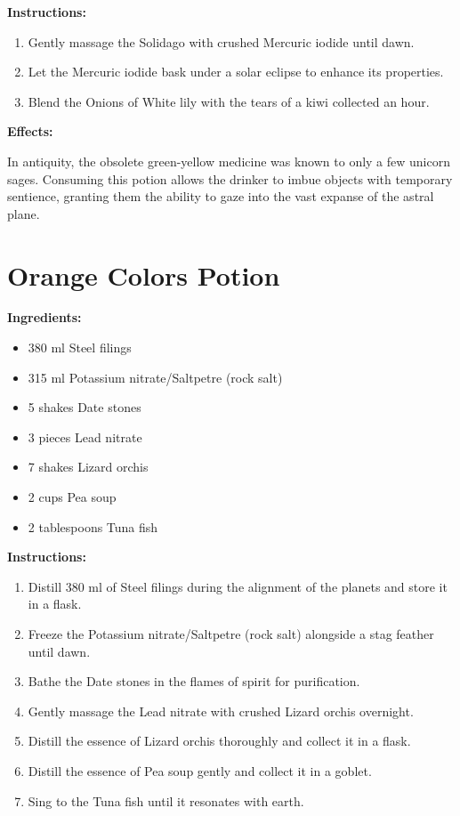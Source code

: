 \documentclass{article}
\begin{document}
\textbf{Instructions:}

\begin{enumerate}
  \item Gently massage the Solidago with crushed Mercuric iodide until dawn.
  \item Let the Mercuric iodide bask under a solar eclipse to enhance its properties.
  \item Blend the Onions of White lily with the tears of a kiwi collected an hour.
\end{enumerate}

\textbf{Effects:}

In antiquity, the obsolete green-yellow medicine was known to only a few unicorn sages. Consuming this potion allows the drinker to imbue objects with temporary sentience, granting them the ability to gaze into the vast expanse of the astral plane.

\newpage
\section*{Orange Colors Potion}

\textbf{Ingredients:}

\begin{itemize}
  \item 380 ml Steel filings
  \item 315 ml Potassium nitrate/Saltpetre (rock salt)
  \item 5 shakes Date stones
  \item 3 pieces Lead nitrate
  \item 7 shakes Lizard orchis
  \item 2 cups Pea soup
  \item 2 tablespoons Tuna fish
\end{itemize}

\textbf{Instructions:}

\begin{enumerate}
  \item Distill 380 ml of Steel filings during the alignment of the planets and store it in a flask.
  \item Freeze the Potassium nitrate/Saltpetre (rock salt) alongside a stag feather until dawn.
  \item Bathe the Date stones in the flames of spirit for purification.
  \item Gently massage the Lead nitrate with crushed Lizard orchis overnight.
  \item Distill the essence of Lizard orchis thoroughly and collect it in a flask.
  \item Distill the essence of Pea soup gently and collect it in a goblet.
  \item Sing to the Tuna fish until it resonates with earth.
\end{enumerate}
\end{document}
